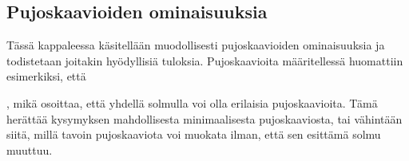 \subsection{Pujoskaavioiden ominaisuuksia}
Tässä kappaleessa käsitellään muodollisesti pujoskaavioiden ominaisuuksia ja todistetaan joitakin hyödyllisiä tuloksia. Pujoskaavioita määritellessä huomattiin esimerkiksi, että
,
mikä osoittaa, että yhdellä solmulla voi olla erilaisia pujoskaavioita. Tämä herättää kysymyksen mahdollisesta minimaalisesta pujoskaaviosta, tai vähintään siitä, millä tavoin pujoskaaviota voi muokata ilman, että sen esittämä solmu muuttuu. 

